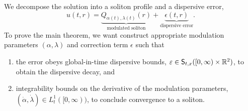 We decompose the solution into a soliton profile and a dispersive error,
\begin{equation}\label{eq:decomp2}
	u(t, r) = \underbrace{Q_{\alpha(t), \lambda(t)}(r)}_{\text{modulated soliton}}  + \underbrace{\epsilon(t, r)}_{\text{dispersive error}} .
\end{equation}
To prove the main theorem, we want construct appropriate modulation parameters $(\alpha, \lambda)$ and correction term $\epsilon$ such that 
	\begin{enumerate}
		\item the error obeys global-in-time dispersive bounds, $\varepsilon \in \mathsf S_{t, x} ([0, \infty) \times \mathbb R^2)$, to obtain the dispersive decay, and \label{item:goal1}
		
		\item integrability bounds on the derivative of the modulation parameters, $(\dot \alpha, \dot \lambda) \in L^1_t ([0, \infty))$, to conclude convergence to a soliton. \label{item:goal2}
	\end{enumerate}

